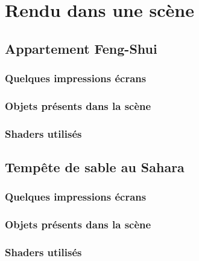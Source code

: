 \chapter{Rendu dans une scène}
 \section{Appartement Feng-Shui}
  \subsection{Quelques impressions écrans}
  \subsection{Objets présents dans la scène}
  \subsection{Shaders utilisés}
 \section{Tempête de sable au Sahara}
  \subsection{Quelques impressions écrans}
  \subsection{Objets présents dans la scène}
  \subsection{Shaders utilisés}
